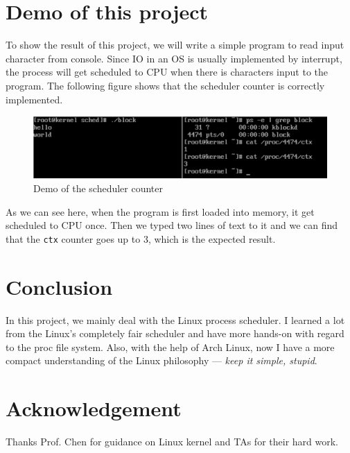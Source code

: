 \documentclass{article}
\begin{document}
\section{Demo of this project}
To show the result of this project, we will write a simple program to read input character from console. Since IO in an OS is usually implemented by interrupt, the process will get scheduled to CPU when there is characters input to the program. The following figure shows that the scheduler counter is correctly implemented.
\begin{figure}[H]
\centering
\includegraphics[width=12cm]{sched.png}
\caption{Demo of the scheduler counter}
\end{figure}
As we can see here, when the program is first loaded into memory, it get scheduled to CPU once. Then we typed two lines of text to it and we can find that the {\tt ctx} counter goes up to 3, which is the expected result.


\section{Conclusion}

In this project, we mainly deal with the Linux process scheduler. I learned a lot from the Linux's completely fair scheduler and have more hands-on with regard to the proc file system. Also, with the help of Arch Linux, now I have a more compact understanding of the Linux philosophy --- \emph{keep it simple, stupid}.

\section*{Acknowledgement}
Thanks Prof. Chen for guidance on Linux kernel and TAs for their hard work.
\end{document}
